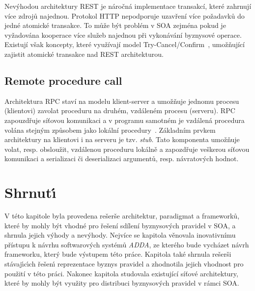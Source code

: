 Nevýhodou architektury \gls{REST} je náročná implementace transakcí, které zahrnují více
zdrojů najednou. Protokol \gls{HTTP} nepodporuje uzavření více požadavků do jedné atomické
transakce. To může být problém v \gls{SOA} zejména pokud je vyžadována kooperace více služeb
najednou při vykonávání byznysové operace. Existují však koncepty, které využívají model
Try-Cancel/Confirm~\cite{pardon2011towards}, umožňující zajistit atomické transakce nad
\gls{REST} architekturou.

\subsection{Remote procedure call}\label{sec:rpc}

Architektura \gls{RPC} staví na modelu klient-server a umožňuje jednomu procesu (klientovi)
zavolat proceduru na druhém, vzdáleném procesu (serveru).
\gls{RPC} zapouzdřuje síťovou komunikaci a v programu samotném
je vzdálená procedura volána stejným způsobem jako lokální procedury~\cite{nelson1981remote}. Základním
prvkem architektury na klientovi i na serveru je tzv. \textit{stub}. Tato komponenta
umožňuje volat, resp. obsloužit, vzdálenou proceduru lokálně a zapozdřuje veškerou
síťovou komunikaci a serializaci či deserializaci argumentů, resp. návratových hodnot.

\section{Shrnut\'{\i}}

V této kapitole byla provedena rešerše architektur, paradigmat a frameworků, které by mohly být vhodné
pro řešení sdílení byznysových pravidel v \gls{SOA}, a shrnula jejich v\'yhody a nev\'yhody.
Nejvíce se kapitola věnovala inovativnímu přístupu k návrhu softwarov\'ych systémů \textit{ADDA},
ze kterého bude vycházet návrh frameworku, který bude výstupem této práce.
Kapitola také shrnula rešerši stávaj\'{\i}c\'{\i}ch řešen\'{\i} reprezentace byznys pravidel
a zhodnotila jejich vhodnost pro použití v této práci. Nakonec kapitola studovala existující
síťové architektury, které by mohly být využity pro distribuci byznysových pravidel v rámci \gls{SOA}.
